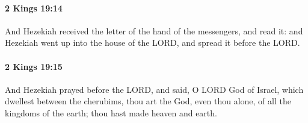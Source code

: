 		\paragraph{2 Kings 19:14} %
			\label{2KINGS-19-14}

			And Hezekiah received the letter of the hand of the messengers, and read it: and Hezekiah went up into the house of the LORD, and spread it before the LORD.


		\paragraph{2 Kings 19:15} %
			\label{2KINGS-19-15}

			And Hezekiah prayed before the LORD, and said, O LORD God of Israel, which dwellest between the cherubims, thou art the God, even thou alone, of all the kingdoms of the earth; thou hast made heaven and earth.


